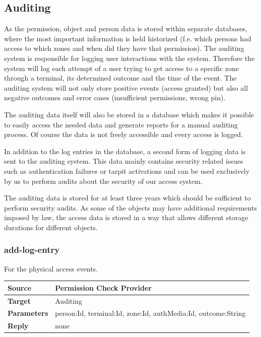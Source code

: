 \documentclass[12pt,a4paper,titlepage,oneside]{scrartcl}
\begin{document}
\subsection{Auditing}
As the permission, object and person data is stored within separate databases, where the most important information is held historized (f.e. which persons had access to which zones and when did they have that permission). The auditing system is responsible for logging user interactions with the system. Therefore the system will log each attempt of a user trying to get access to a specific zone through a terminal, its determined outcome and the time of the event. The auditing system will not only store positive events (access granted) but also all negative outcomes and error cases (insufficient permissions, wrong pin).

The auditing data itself will also be stored in a database which makes it possible to easily access the needed data and generate reports for a manual auditing process. Of course the data is not freely accessible and every access is logged.

In addition to the log entries in the database, a second form of logging data is sent to the auditing system. This data mainly contains security related issues such as authentication failures or tarpit activations and can be used exclusively by us to perform audits about the security of our access system.

The auditing data is stored for at least three years which should be sufficient to perform security audits. As some of the objects may have additional requirements imposed by law, the access data is stored in a way that allows different storage durations for different objects.

\subsubsection{add-log-entry}
For the physical access events.

\begin{table}[h]
    \centering
    \begin{tabular}{|l|p{12cm}|} \hline
    \textbf{Source}&Permission Check Provider\\ \hline
    \textbf{Target}&Auditing\\ \hline
    \textbf{Parameters}&person:Id, terminal:Id, zone:Id, authMedia:Id, outcome:String\\ \hline
    \textbf{Reply}&none\\ \hline
    \end{tabular}
\end{table}
\end{document}
